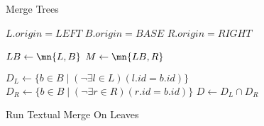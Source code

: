 \documentclass[../Algorithms.tex]{subfiles}
\begin{document}
    \begin{algorithm}[H]
        \caption{Merge Trees}


        \BlankLine

        $L.origin = LEFT$\;
        $B.origin = BASE$\;
        $R.origin = RIGHT$\;

        \BlankLine
        $LB \leftarrow \mn{L, B}$\;
        $M \leftarrow \mn{LB, R}$\;

        \BlankLine
        $D_L \leftarrow \{ b \in B \mid (\lnot \exists l \in L) (l.id = b.id) \}$\;
        $D_R \leftarrow \{ b \in B \mid (\lnot \exists r \in R) (r.id = b.id) \}$\;
        $D \leftarrow D_{L} \cap D_{R}$\;

        \BlankLine

        \BlankLine
        \;

        \BlankLine
        \;
    \end{algorithm}

    \begin{algorithm}[H]
        \caption{Run Textual Merge On Leaves}


        \BlankLine

        \BlankLine
    \end{algorithm}
\end{document}
